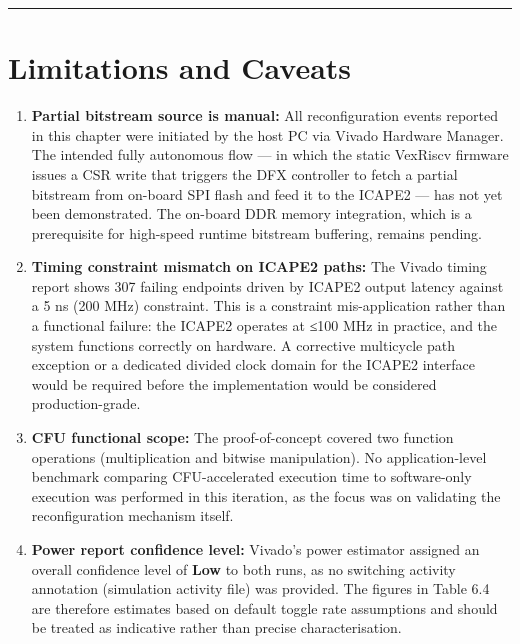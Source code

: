 \vspace{0.4em}\hrule\vspace{0.4em}

\section{Limitations and Caveats}

\begin{enumerate}
  \item \textbf{Partial bitstream source is manual:} All reconfiguration events reported in this chapter were initiated by the host PC via Vivado Hardware Manager. The intended fully autonomous flow — in which the static VexRiscv firmware issues a CSR write that triggers the DFX controller to fetch a partial bitstream from on-board SPI flash and feed it to the ICAPE2 — has not yet been demonstrated. The on-board DDR memory integration, which is a prerequisite for high-speed runtime bitstream buffering, remains pending.
  \item \textbf{Timing constraint mismatch on ICAPE2 paths:} The Vivado timing report shows 307 failing endpoints driven by ICAPE2 output latency against a 5 ns (200 MHz) constraint. This is a constraint mis-application rather than a functional failure: the ICAPE2 operates at ≤100 MHz in practice, and the system functions correctly on hardware. A corrective multicycle path exception or a dedicated divided clock domain for the ICAPE2 interface would be required before the implementation would be considered production-grade.
  \item \textbf{CFU functional scope:} The proof-of-concept covered two function operations (multiplication and bitwise manipulation). No application-level benchmark comparing CFU-accelerated execution time to software-only execution was performed in this iteration, as the focus was on validating the reconfiguration mechanism itself.
  \item \textbf{Power report confidence level:} Vivado's power estimator assigned an overall confidence level of \textbf{Low} to both runs, as no switching activity annotation (simulation activity file) was provided. The figures in Table 6.4 are therefore estimates based on default toggle rate assumptions and should be treated as indicative rather than precise characterisation.
\end{enumerate}